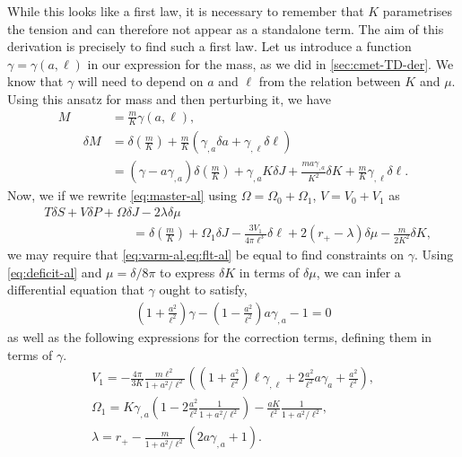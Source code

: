 \documentclass[
twoside,
openright,
frontopenright
]{dmathesis}
\newcommand{\nn}{\nonumber}
\begin{document}
While this looks like a first law, it is necessary to remember that $K$
parametrises the tension and can therefore not appear as a standalone term. The
aim of this derivation is precisely to find such a first law. Let us introduce a
function $\gamma = \gamma(a,\ell)$ in our expression for the mass, as we did in
\cref{sec:cmet-TD-der}. We know that $\gamma$ will need to depend on $a$ and
$\ell$ from the relation between $K$ and $\mu$. Using this ansatz for mass and
then perturbing it, we have  
\begin{align}  
  M&=\frac{m}{K}\gamma(a,\ell),\\
  \qquad \delta M &= \delta \left(\frac{m}{K}\right) +\frac{m}{K}(\gamma_{,a}
                    \delta a + \gamma_{,\ell}\delta\ell)\nn\\
   &= (\gamma - a\gamma_{,a})\delta \left(\frac{m}{K}\right) +
     \gamma_{,a}K\delta J + \frac{m a \gamma_{,a}}{K^{2}}\delta K +
     \frac{m}{K}\gamma_{,\ell}\delta \ell.
     \label{eq:varm-al}
\end{align}
Now, we if we rewrite \cref{eq:master-al} using $\Omega = \Omega_0+\Omega_1$, $V =
V_0 + V_1$ as
\begin{align}
  \label{eq:flt-al}
  &T\delta S + V\delta P + \Omega \delta J - 2\lambda \delta \mu\nn\\
  &\hspace{7em}= \delta
  \left(\frac{m}{K}\right) + \Omega_1\delta J -\frac{3V_1}{4\pi \ell^3}\delta
  \ell + 2(r_+-\lambda)\delta\mu -\frac{m}{2K^2}\delta K,
\end{align}
we may require that \cref{eq:varm-al,eq:flt-al} be equal to find constraints on
$\gamma$. Using \cref{eq:deficit-al} and $\mu=\delta/8\pi$ to express $\delta K$
in terms of $\delta \mu$, we can infer a differential equation that $\gamma$
ought to satisfy,
\begin{align}\label{eq:eq1al}
\left(1+\frac{a^2}{\ell^2}\right)\gamma-
  \left(1-\frac{a^{2}}{\ell^{2}}\right)a\gamma_{,a}-1=0 
\end{align}
as well as the following expressions for the correction terms, defining them in
terms of $\gamma$. 
\begin{gather}
V_1=-\frac{4\pi}{3K}\frac{m
  \ell^2}{1+a^2/\ell^2}\left(\left(1+\frac{a^2}{\ell^2}\right)
  \ell\gamma_{,\ell}+2\frac{a^2}{\ell^2}a
  \gamma_{a}+\frac{a^2}{\ell^2}\right),\nn\\  
\Omega_1=K\gamma_{,a}\left(1-2\frac{a^2}{\ell^2}\frac{1}{1+a^2/\ell^2}\right)-
\frac{aK}{\ell^2}\frac{1}{1+a^2/\ell^2},\nn\\ 
\lambda=r_+-\frac{m}{1+a^2/\ell^2}\left(2a\gamma_{,a}+1\right). 
\end{gather}
\end{document}
